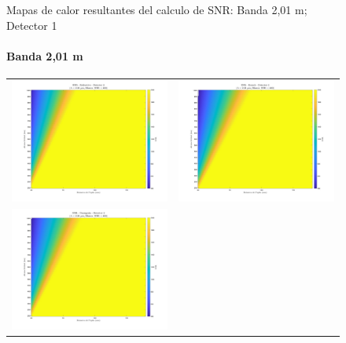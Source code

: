 \begin{landscape}
\begin{figure}[p]
\begin{tabular}{cc}
\end{tabular}
\caption{Mapas de calor resultantes del calculo de SNR: Banda 2,01 \textmu m; Detector 1}
\end{figure}
\end{landscape}


\begin{landscape}
\begin{figure}[p]
\centering
\setlength{\tabcolsep}{2pt}
\renewcommand{\arraystretch}{0}

\paragraph{Banda 2,01 \textmu m}
\begin{tabular}{cc}
\includegraphics[width=0.48\linewidth]{4.Payload/SNR/SNR_Lambda2_Detector2_Telescopio1_heatmap.jpg} &
\includegraphics[width=0.48\linewidth]{4.Payload/SNR/SNR_Lambda2_Detector2_Telescopio2_heatmap.jpg} \\
\includegraphics[width=0.48\linewidth]{4.Payload/SNR/SNR_Lambda2_Detector2_Telescopio3_heatmap.jpg} &

\end{tabular}
\end{figure}
\end{landscape}
